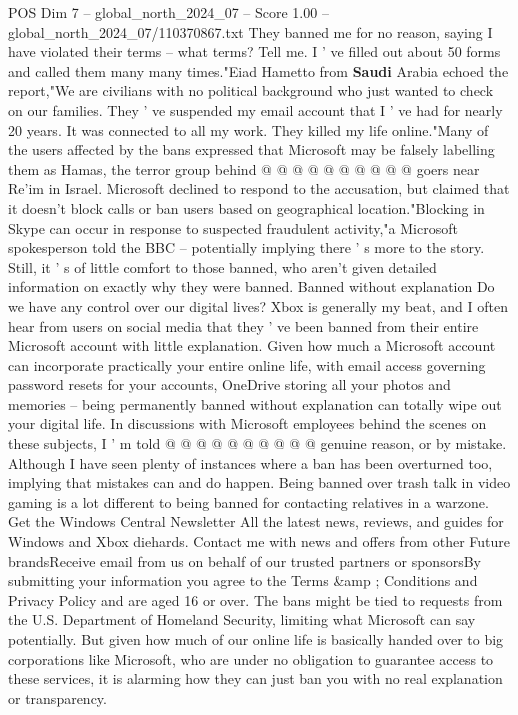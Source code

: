 \begin{textsample}{POS Dim 7 – global\_north\_2024\_07 – Score 1.00 – global\_north\_2024\_07/110370867.txt}
They banned me for no reason, saying I have violated their terms -- what terms?
Tell me.
I ' ve filled out about 50 forms and called them many many times."Eiad Hametto from \textbf{Saudi} Arabia echoed the report,"We are civilians with no political background who just wanted to check on our families.
They ' ve suspended my email account that I ' ve had for nearly 20 years.
It was connected to all my work.
They killed my life online."Many of the users affected by the bans expressed that Microsoft may be falsely labelling them as Hamas, the terror group behind @ @ @ @ @ @ @ @ @ @ goers near Re'im in Israel.
Microsoft declined to respond to the accusation, but claimed that it doesn't block calls or ban users based on geographical location."Blocking in Skype can occur in response to suspected fraudulent activity,"a Microsoft spokesperson told the BBC -- potentially implying there ' s more to the story.
Still, it ' s of little comfort to those banned, who aren't given detailed information on exactly why they were banned.
Banned without explanation Do we have any control over our digital lives?
Xbox is generally my beat, and I often hear from users on social media that they ' ve been banned from their entire Microsoft account with little explanation.
Given how much a Microsoft account can incorporate practically your entire online life, with email access governing password resets for your accounts, OneDrive storing all your photos and memories -- being permanently banned without explanation can totally wipe out your digital life.
In discussions with Microsoft employees behind the scenes on these subjects, I ' m told @ @ @ @ @ @ @ @ @ @ genuine reason, or by mistake.
Although I have seen plenty of instances where a ban has been overturned too, implying that mistakes can and do happen.
Being banned over trash talk in video gaming is a lot different to being banned for contacting relatives in a warzone.
Get the Windows Central Newsletter All the latest news, reviews, and guides for Windows and Xbox diehards.
Contact me with news and offers from other Future brandsReceive email from us on behalf of our trusted partners or sponsorsBy submitting your information you agree to the Terms \&amp ; Conditions and Privacy Policy and are aged 16 or over.
The bans might be tied to requests from the U.S.
Department of Homeland Security, limiting what Microsoft can say potentially.
But given how much of our online life is basically handed over to big corporations like Microsoft, who are under no obligation to guarantee access to these services, it is alarming how they can just ban you with no real explanation or transparency.

\end{textsample}
